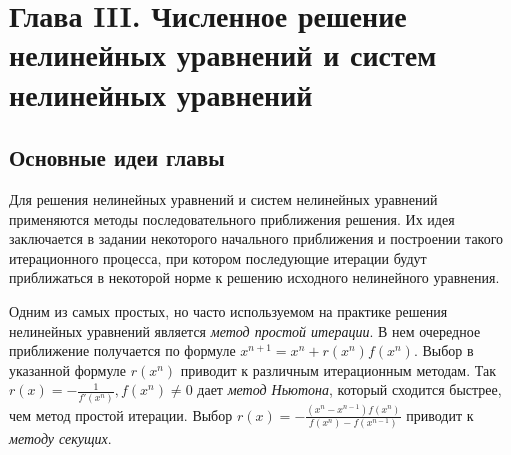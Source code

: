 \newpage
{}
\pagestyle{empty}
\vspace{0.5cm}


\section*{Глава III. Численное решение нелинейных уравнений и систем нелинейных уравнений}

\subsection{Основные идеи главы} 
 
Для решения нелинейных уравнений и систем нелинейных уравнений применяются методы последовательного приближения решения. Их идея заключается в задании некоторого начального приближения и построении такого итерационного процесса, при котором последующие итерации будут приближаться в некоторой норме к решению исходного нелинейного уравнения.
 
Одним из самых простых, но часто используемом на практике решения нелинейных уравнений является \textit{метод простой итерации}. В нем очередное приближение получается по формуле 
\begin{math} x^{n + 1} = x^n + r(x^n)f(x^n) \end{math}. 
Выбор в указанной формуле $r(x^n)$ приводит к различным итерационным методам. Так \begin{math} r(x) = -\frac{1}{f'(x^n)}, f(x^n) \neq 0 \end{math} дает \textit{метод Ньютона}, который сходится быстрее, чем метод простой итерации.
Выбор \begin{math} r(x) = - \frac{(x^n - x^{n - 1})f(x^n)}{f(x^n) - f(x^{n - 1})} \end{math} приводит к \textit{методу секущих}.

\newpage
